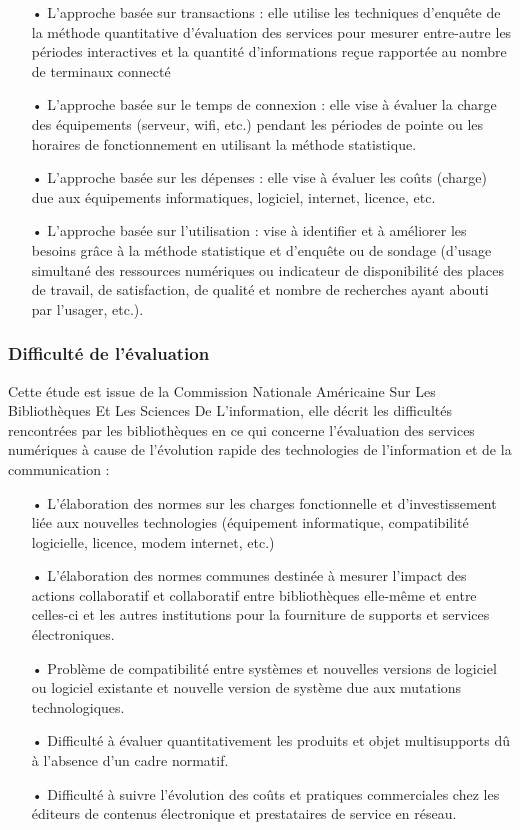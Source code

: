 \documentclass[french,a4paper,12pt]{article}
\begin{document}
\begin{enumerate}
\item[•]L’approche basée sur transactions : elle utilise les techniques d’enquête de la méthode quantitative d’évaluation des services pour mesurer entre-autre les périodes interactives et la quantité d'informations reçue rapportée au nombre de terminaux connecté 
\item[•]L’approche basée sur le temps de connexion : elle vise à évaluer la charge des équipements (serveur, wifi, etc.) pendant les périodes de pointe ou les horaires de fonctionnement en utilisant la méthode statistique.
\item[•]L'approche basée sur les dépenses : elle vise à évaluer les coûts (charge) due aux équipements informatiques, logiciel, internet, licence, etc.
\item[•]L’approche basée sur l’utilisation : vise à identifier et à améliorer les besoins grâce à la méthode statistique et d'enquête ou de sondage (d’usage simultané des ressources numériques ou indicateur de disponibilité des places de travail, de satisfaction, de qualité et nombre de recherches ayant abouti par l’usager, etc.).
\end{enumerate}




\subsubsection{Difficulté de l'évaluation}
\quad Cette étude est issue de la Commission Nationale Américaine Sur Les Bibliothèques Et Les Sciences De L’information, elle décrit les difficultés rencontrées par les bibliothèques en ce qui concerne l’évaluation des services numériques à cause de l’évolution rapide des technologies de l’information et de la communication \citep{bertot_1996}: 

\begin{enumerate}
\item[•]L’élaboration des normes sur les charges fonctionnelle et d’investissement liée aux nouvelles technologies (équipement informatique, compatibilité logicielle, licence, modem internet, etc.)
\item[•]L’élaboration des normes communes destinée à mesurer l’impact des actions collaboratif et collaboratif entre bibliothèques elle-même et entre celles-ci et les autres institutions pour la fourniture de supports et services électroniques.
\item[•]Problème de compatibilité entre systèmes et nouvelles versions de logiciel ou logiciel existante et nouvelle version de système due aux mutations technologiques.
\item[•]Difficulté à évaluer quantitativement les produits et objet multisupports dû à l’absence d’un cadre normatif.
\item[•]Difficulté à suivre l’évolution des coûts et pratiques commerciales chez les éditeurs de contenus électronique et prestataires de service en réseau.\\

\end{enumerate}
\end{document}
